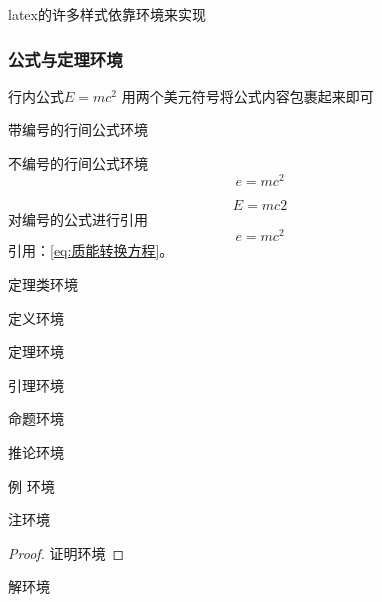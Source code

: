 \documentclass[supercite,fontset=windows]{../../upcthesis}
\begin{document}
latex的许多样式依靠环境来实现


\subsubsection{公式与定理环境}

行内公式$E=mc^2$ 用两个美元符号将公式内容包裹起来即可


带编号的行间公式环境

不编号的行间公式环境
\[
e=mc^{2}
\]

\begin{equation}
E=mc2
\end{equation}
对编号的公式进行引用
\begin{equation}
  \label{eq:质能转换方程}
e=mc^{2}
\end{equation}
引用：\autoref{eq:质能转换方程}。





定理类环境

\begin{definition}
定义环境
\end{definition}

\begin{theorem}
定理环境
\end{theorem}


\begin{lemma}
引理环境
\end{lemma}


\begin{proposition}
命题环境
\end{proposition}



\begin{corollary}
推论环境
\end{corollary}


\begin{example}
例 环境
\end{example}




\begin{remark}
  注环境
\end{remark}





\begin{proof}
证明环境
\end{proof}


\begin{solution}
解环境
\end{solution}
\end{document}
